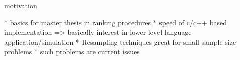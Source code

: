 motivation

* basics for master thesis in ranking procedures
* speed of c/c++ based implementation => basically interest in lower level language application/simulation
* Resampling techniques great for small sample size problems
* such problems are current issues